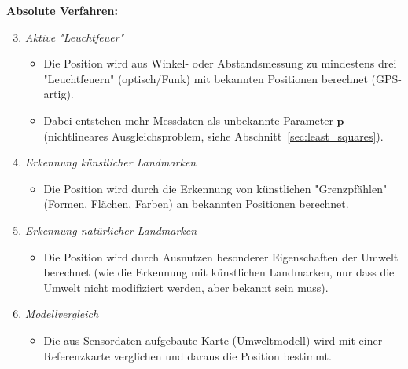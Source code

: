 \documentclass[a4paper, 11pt, accentcolor = tud3b]{tudreport}
\renewcommand{\vec}[1]{\boldsymbol{\mathbf{#1}}}
\begin{document}
			\textbf{Absolute Verfahren:}
			\begin{enumerate} \setcounter{enumi}{2}
				\item \emph{Aktive "Leuchtfeuer"}
					\begin{itemize}
						\item Die Position wird aus Winkel- oder Abstandsmessung zu mindestens drei "Leuchtfeuern" (optisch/Funk) mit bekannten Positionen berechnet (GPS-artig).
						\item Dabei entstehen mehr Messdaten als unbekannte Parameter \(\vec{p}\) (nichtlineares Ausgleichsproblem, siehe Abschnitt~\ref{sec:least_squares}).
					\end{itemize}
				\item \emph{Erkennung künstlicher Landmarken}
					\begin{itemize}
						\item Die Position wird durch die Erkennung von künstlichen "Grenzpfählen" (Formen, Flächen, Farben) an bekannten Positionen berechnet.
					\end{itemize}
				\item \emph{Erkennung natürlicher Landmarken}
					\begin{itemize}
						\item Die Position wird durch Ausnutzen besonderer Eigenschaften der Umwelt berechnet (wie die Erkennung mit künstlichen Landmarken, nur dass die Umwelt nicht modifiziert werden, aber bekannt sein muss).
					\end{itemize}
				\item \emph{Modellvergleich}
					\begin{itemize}
						\item Die aus Sensordaten aufgebaute Karte (Umweltmodell) wird mit einer Referenzkarte verglichen und daraus die Position bestimmt.
					\end{itemize}
			\end{enumerate}
		
\end{document}
